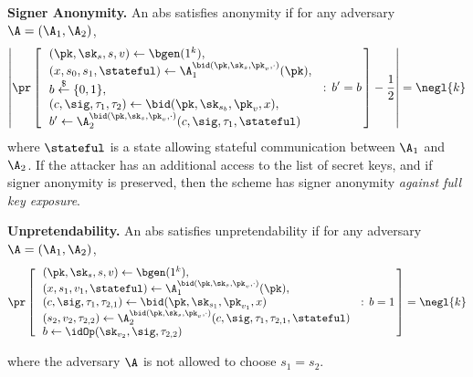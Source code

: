 \begin{description}
\item \textbf{Signer Anonymity.} An \gls{abs} satisfies anonymity if for any \ppt adversary $\A=(\A_1,\A_2)$,
\begin{equation*}
    \left|\pr\left[\,\begin{array}{l}
      (\pk,\sk_s, s,v) \gets \bgen(1^k),\\
      (x,s_0,s_1,\stateful) \gets \A_1^{\bid(\pk,\sk_s,\pk_v,\cdot)}(\pk),\\
      b \overset{\$}{\leftarrow} \{0,1\},\\
      (c,\sig,\tau_1,\tau_2) \gets \bid(\pk,\sk_{s_b},\pk_v,x),\\
      b' \gets \A_2^{\bid(\pk,\sk_s,\pk_v,\cdot)}(c,\sig,\tau_1, \stateful)
    \end{array}\,: \, b'=b \,\right] - \frac{1}{2}\right| = \negl{k}
\end{equation*}
where $\stateful$ is a state allowing stateful communication between $\A_1$ and $\A_2$.
If the attacker has an additional access to the list of secret keys, and if signer anonymity is preserved, then the scheme has signer anonymity \textit{against full key exposure}.

\item \textbf{Unpretendability.} An \gls{abs} satisfies unpretendability if for any \ppt adversary $\A=(\A_1,\A_2)$,
\begin{equation*}
    \pr\left[\,\begin{array}{l}
      (\pk,\sk_s,s,v) \gets \bgen(1^k),\\
      (x,s_1, v_1, \stateful) \gets \A_1^{\bid(\pk,\sk_s,\pk_v,\cdot)}(\pk),\\
      (c, \sig, \tau_1,\tau_{2,1}) \gets \bid(\pk,\sk_{s_1},\pk_{v_1},x)\\
      (s_2, v_2,\tau_{2,2}) \gets \A_2^{\bid(\pk,\sk_s,\pk_v,\cdot)}(c,\sig,\tau_1,\tau_{2,1},\stateful)\\
      b \gets \idOp(\sk_{v_2},\sig,\tau_{2,2})
    \end{array}\,: \, b=1 \,\right] = \negl{k}
\end{equation*}

where the adversary $\A$ is not allowed to choose $s_1=s_2$.
\end{description}